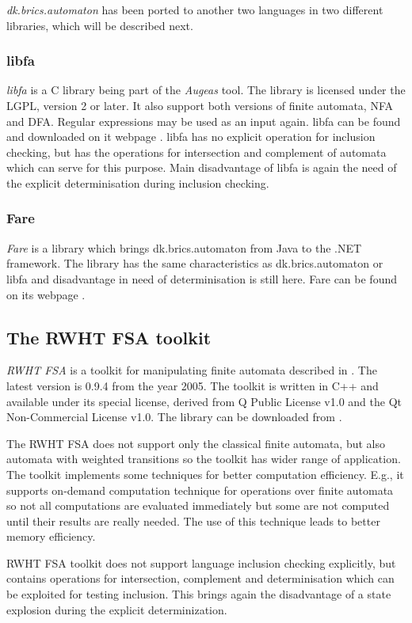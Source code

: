 \emph{dk.brics.automaton} has been ported to another two languages in two different libraries, which will be described next.

\subsubsection{libfa}
\emph{libfa} is a C library being part of the \emph{Augeas} tool. 
The library is licensed under the LGPL, version 2 or later. It also support both versions of finite automata, NFA and DFA. 
Regular expressions may be used as an input again.
libfa can be found and downloaded on it webpage \cite{libfa}.
libfa has no explicit operation for inclusion checking, but has the operations for intersection and complement of automata
which can serve for this purpose.
Main disadvantage of libfa is again the need of the explicit determinisation during inclusion checking.

\subsubsection{Fare}
\emph{Fare} is a library which brings dk.brics.automaton from Java to the .NET framework. 
The library has the same characteristics as dk.brics.automaton or libfa and disadvantage in need of determinisation is still here. 
Fare can be found on its webpage \cite{fare}.

\subsection{The RWHT FSA toolkit}
\emph{RWHT FSA} is a toolkit for manipulating finite automata described in \cite{kanthakN04}. 
The latest version is 0.9.4 from the year 2005. The toolkit is written in C++
and available under its special license, derived from Q Public License v1.0 and the Qt Non-Commercial License v1.0. The library can be downloaded from \cite{rwth}. 

The RWHT FSA does not support only the classical finite automata, but also automata with weighted transitions so the toolkit has wider range of application.
The toolkit implements some techniques for better computation efficiency. E.g., it supports on-demand computation technique for operations over finite automata 
so not all computations are evaluated immediately but some are not computed until their results are really
needed. The use of this technique leads to better memory efficiency. 

RWHT FSA toolkit does not support language inclusion checking explicitly, but contains operations for intersection, complement and
determinisation which can be exploited for testing inclusion. This brings again the disadvantage of a state explosion during 
the explicit determinization. 

